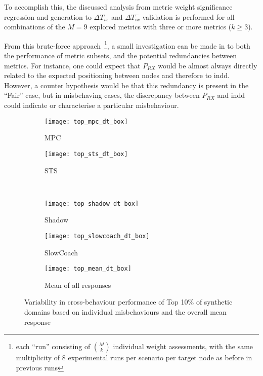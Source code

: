 To accomplish this, the discussed analysis from metric weight significance regression and generation to $\Delta{T}_{ix}$ and $\Delta{T}_{ix}^-$ validation is performed for all combinations of the $M=9$ explored metrics with three or more metrics ($k\ge3$). 

From this brute-force approach~\footnote{each ``run'' consisting of ${M\choose{k}}$ individual weight assessments, with the same multiplicity of 8 experimental runs per scenario per target node as before in previous runs}, a small investigation can be made in to both the performance of metric subsets, and the potential redundancies between metrics. 
For instance, one could expect that $P_{RX}$ would be almost always directly related to the expected positioning between nodes and therefore to \gls{indd}.
However, a counter hypothesis would be that this redundancy is present in the ``Fair'' case, but in misbehaving cases, the discrepancy between $P_{RX}$ and \gls{indd} could indicate or characterise a particular misbehaviour. 

\begin{figure}
	\begin{subfigure}[b]{0.5\textwidth}
		\centering
		\texttt{[image: top\_mpc\_dt\_box]}
		\caption{MPC}
		\label{fig:top_mpc_dt_box}
	\end{subfigure}
	\begin{subfigure}[b]{0.5\textwidth}
		\centering
		\texttt{[image: top\_sts\_dt\_box]}
		\caption{STS}
		\label{fig:top_sts_dt_box}
	\end{subfigure}\\
	
	\begin{subfigure}[b]{0.5\textwidth}
		\centering
		\texttt{[image: top\_shadow\_dt\_box]}
		\caption{Shadow}
		\label{fig:top_shadow_dt_box}
	\end{subfigure}
	\begin{subfigure}[b]{0.5\textwidth}
		\centering
		\texttt{[image: top\_slowcoach\_dt\_box]}
		\caption{SlowCoach}
		\label{fig:top_slowcoach_dt_box}
	\end{subfigure}
	
	\centering
	\begin{subfigure}[b]{0.5\textwidth}
		\centering
		\texttt{[image: top\_mean\_dt\_box]}
		\caption{Mean of all responses}
		\label{fig:top_mean_dt_box}
	\end{subfigure}
	\caption{Variability in cross-behaviour performance of Top 10\% of synthetic domains based on individual misbehaviours and the overall mean response}\label{fig:top_dt_boxes}
\end{figure}

